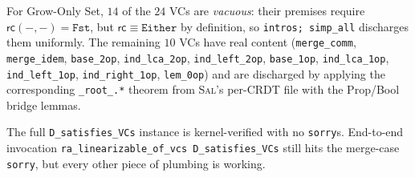 \documentclass[11pt,a4paper]{article}
\theoremstyle{definition}
\theoremstyle{remark}
\newcommand{\mrc}{\mathsf{rc}}
\newcommand{\Either}{\mathtt{Either}}
\newcommand{\Fst}{\mathtt{Fst}}
\newcommand{\Sal}{\textsc{Sal}}
\newcommand{\sorry}{\texttt{sorry}}
\begin{document}
For Grow-Only Set, $14$ of the $24$ VCs are \emph{vacuous}: their
premises require $\mrc(-, -) = \Fst$, but $\mrc \equiv \Either$ by
definition, so \texttt{intros; simp\_all} discharges them
uniformly. The remaining $10$ VCs have real content
(\texttt{merge\_comm}, \texttt{merge\_idem}, \texttt{base\_2op},
\texttt{ind\_lca\_2op}, \texttt{ind\_left\_2op}, \texttt{base\_1op},
\texttt{ind\_lca\_1op}, \texttt{ind\_left\_1op},
\texttt{ind\_right\_1op}, \texttt{lem\_0op}) and are discharged by
applying the corresponding \texttt{\_root\_.*} theorem from \Sal{}'s
per-CRDT file with the Prop/Bool bridge lemmas.

The full \texttt{D\_satisfies\_VCs} instance is kernel-verified with
no \sorry{}s. End-to-end invocation
\texttt{ra\_linearizable\_of\_vcs D\_satisfies\_VCs} still hits the
merge-case \sorry{}, but every other piece of plumbing is working.
\end{document}
